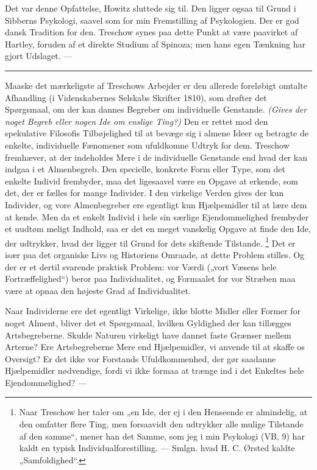 \documentclass[12pt,a4paper,openany]{book}
\newcommand{\opage}[1]{\marginnote{\footnotesize\textit{[#1]}}}
\begin{document}
Det var denne Opfattelse, Howitz sluttede sig til. Den ligger ogsaa til Grund i
Sibberns Psykologi, saavel som for min Fremstilling af Psykologien. Der er god
dansk Tradition for den. Treschow synes paa dette Punkt at være paavirket af
Hartley, foruden af et direkte Studium af Spinoza; men hans egen Tænkning har
gjort Udslaget. ---

\begin{center}\rule{2cm}{0.4pt}\end{center}

Maaske det mærkeligste af Treschows Arbejder er den allerede foreløbigt omtalte
Afhandling (i Videnskabernes Selskabs Skrifter 1810), som drøfter det
Spørgsmaal, om der kan dannes Begreber om individuelle Genstande.
\textit{(Gives der noget Begreb eller nogen Ide om enslige Ting?)} Den er
rettet mod den spekulative Filosofis Tilbøjelighed til at bevæge sig i almene
Ideer og betragte de enkelte, individuelle Fænomener som ufuldkomne Udtryk for
dem. Treschow fremhæver, at der indeholdes Mere i de individuelle Genstande end
hvad der kan indgaa i et Almenbegreb. Den specielle, konkrete Form eller Type,
som det enkelte Individ frembyder, maa det ligesaavel være en Opgave at
erkende, som det, der er fælles for mange Individer. I den virkelige Verden
gives der kun Individer, og vore Almenbegreber ere egentligt kun Hjælpemidler
til at lære dem at kende. Men da et enkelt Individ i hele sin særlige
Ejendommelighed frembyder et uudtøm%
\setcounter{footnote}{0}%
\opage{92}meligt Indhold, saa er det en meget vanskelig Opgave at finde den
Ide, der udtrykker, hvad der ligger til Grund for dets skiftende Tilstande.%
\footnote[1]{Naar Treschow her taler om „en Ide, der ej i den Henseende er
almindelig, at den omfatter flere Ting, men forsaavidt den udtrykker alle
mulige Tilstande af den samme“, mener han det Samme, som jeg i min Psykologi
(VB, 9) har kaldt en typisk Individualforestilling. --- Smlgn. hvad H. C.
Ørsted kaldte „Samfoldighed“.} Det er især paa det organiske Livs og Historiens
Omraade, at dette Problem stilles. Og der er et dertil svarende praktisk
Problem: vor Værdi („vort Væsens hele Fortræffelighed“) beror paa
Individualitet, og Formaalet for vor Stræben maa være at opnaa den højeste Grad
af Individualitet.

Naar Individerne ere det egentligt Virkelige, ikke blotte Midler eller Former
for noget Alment, bliver det et Spørgsmaal, hvilken Gyldighed der kan tillægges
Artsbegreberne. Skulde Naturen virkeligt have dannet faste Grænser mellem
Arterne? Ere Artsbegreberne Mere end Hjælpemidler, vi anvende til at skaffe os
Oversigt? Er det ikke vor Forstands Ufuldkommenhed, der gør saadanne
Hjælpemidler nødvendige, fordi vi ikke formaa at trænge ind i det Enkeltes hele
Ejendommelighed? ---
\end{document}
